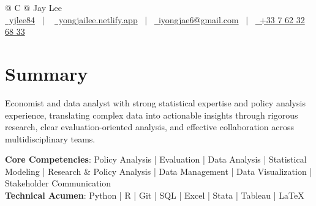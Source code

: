 \documentclass[a4paper,12pt]{article}
\begin{document}
\pagestyle{empty} 



\begin{tabularx}{\linewidth}{@{} C @{}}
\Huge{Jay Lee} \\[7.5pt]
\href{https://github.com/yjlee84}{\raisebox{-0.05\height}\faGithub\ yjlee84} \ $|$ \ 
\href{https://yongjailee.netlify.app}{\raisebox{-0.05\height}\faGlobe \ yongjailee.netlify.app} \ $|$ \ 
\href{mailto:email@mysite.com}{\raisebox{-0.05\height}\faEnvelope \ iyongjae6@gmail.com} \ $|$ \ 
\href{tel:+000000000000}{\raisebox{-0.05\height}\faMobile \ +33 7 62 32 68 33} \\
\end{tabularx}


\section{Summary}
Economist and data analyst with strong statistical expertise and policy analysis experience, translating complex data into actionable insights through rigorous research, clear evaluation-oriented analysis, and effective collaboration across multidisciplinary teams.

\textbf{Core Competencies}: Policy Analysis | Evaluation | Data Analysis | Statistical Modeling | Research \& Policy Analysis | Data Management | Data Visualization | Stakeholder Communication\\
\textbf{Technical Acumen}: Python | R | Git | SQL | Excel | Stata | Tableau | \LaTeX{}
\end{document}
